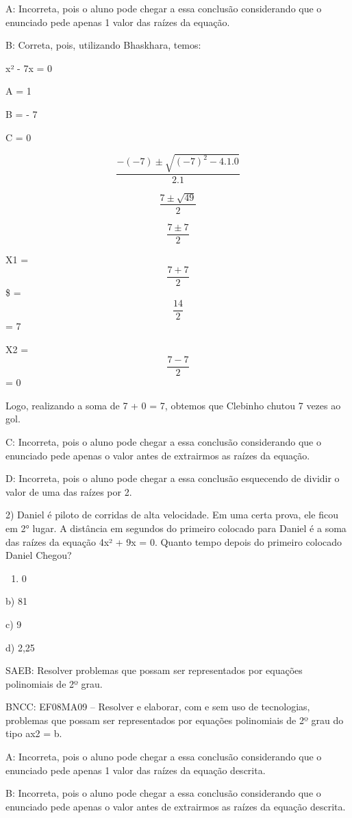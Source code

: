 A: Incorreta, pois o aluno pode chegar a essa conclusão considerando que
o enunciado pede apenas 1 valor das raízes da equação.

B: Correta, pois, utilizando Bhaskhara, temos:

x² - 7x = 0

A = 1

B = - 7

C = 0

\[\frac{- ( - 7) \pm \sqrt{{( - 7)}^{2} - 4.1.0}}{2.1}\]

\[\frac{7 \pm \sqrt{49}}{2}\]

\[\frac{7 \pm 7}{2}\]

X1 = \[\frac{7 + 7}{2}\]\$ = \[\frac{14}{2}\] = 7

X2 = \[\frac{7 - 7}{2}\] = 0

Logo, realizando a soma de 7 + 0 = 7, obtemos que Clebinho chutou 7
vezes ao gol.

C: Incorreta, pois o aluno pode chegar a essa conclusão considerando que
o enunciado pede apenas o valor antes de extrairmos as raízes da
equação.

D: Incorreta, pois o aluno pode chegar a essa conclusão esquecendo de
dividir o valor de uma das raízes por 2.

2) Daniel é piloto de corridas de alta velocidade. Em uma certa prova,
ele ficou em 2° lugar. A distância em segundos do primeiro colocado para
Daniel é a soma das raízes da equação 4x² + 9x = 0. Quanto tempo depois
do primeiro colocado Daniel Chegou?

\begin{enumerate}
\def\labelenumi{\alph{enumi})}
\tightlist
\item
  0
\end{enumerate}

b) 81

c) 9

d) 2,25

SAEB: Resolver problemas que possam ser representados por equações
polinomiais de 2º grau.

BNCC: EF08MA09 -- Resolver e elaborar, com e sem uso de tecnologias,
problemas que possam ser representados por equações polinomiais de 2º
grau do tipo ax2 = b.

A: Incorreta, pois o aluno pode chegar a essa conclusão considerando que
o enunciado pede apenas 1 valor das raízes da equação descrita.

B: Incorreta, pois o aluno pode chegar a essa conclusão considerando que
o enunciado pede apenas o valor antes de extrairmos as raízes da equação
descrita.

